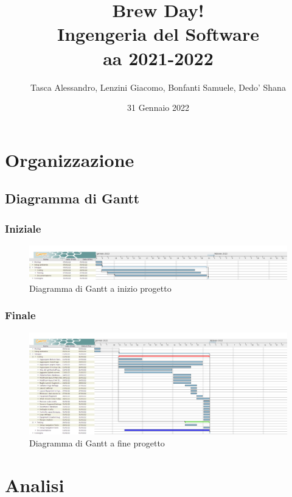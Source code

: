 \documentclass[12pt]{article}
\title{
  Brew Day! \\ 
  \large Ingengeria del Software \\
    aa 2021-2022}
\author{Tasca Alessandro, Lenzini Giacomo, Bonfanti Samuele, Dedo' Shana}
\date{31 Gennaio 2022}
\begin{document}
\maketitle
\newpage


\tableofcontents
\newpage
\section{Organizzazione}

\subsection{Diagramma di Gantt}

\subsubsection{Iniziale}
\begin{figure}[H]
\centering
\includegraphics[width=440px]{gantt_iniziale.png}
\caption{\label{fig:gantt_iniziale}Diagramma di Gantt a inizio progetto}
\end{figure}

\subsubsection{Finale}
\begin{figure}[H]
\centering
\includegraphics[width=440px]{gantt_finale.png}
\caption{\label{fig:gantt_finale}Diagramma di Gantt a fine progetto}
\end{figure}
\newpage
\section{Analisi}
\end{document}
